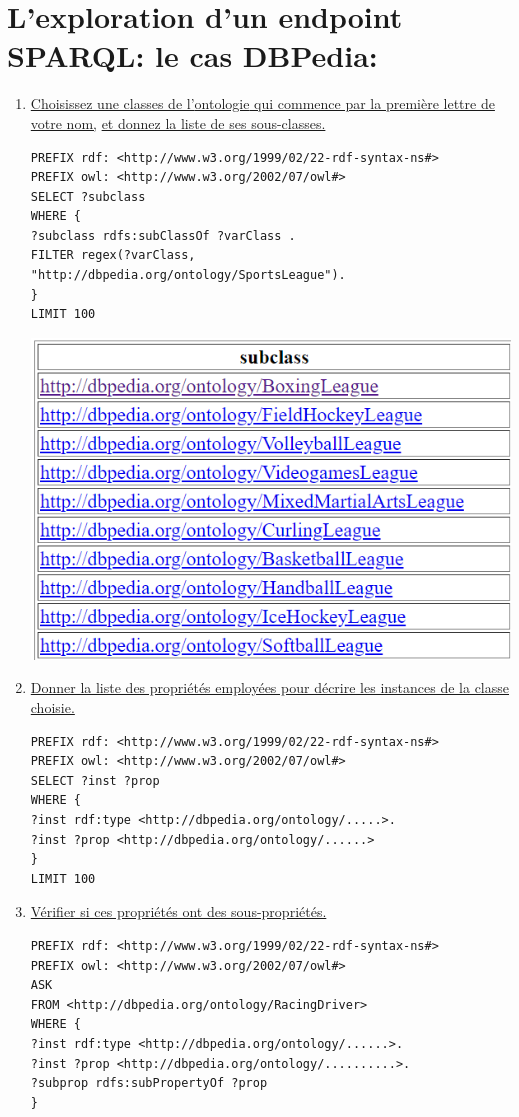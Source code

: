 \documentclass[12pt,a4paper]{article}
\begin{document}
    \section{L'exploration d'un endpoint SPARQL: le cas DBPedia: }
    \begin{justify}
        \begin{enumerate}
            \item \underline{Choisissez une classes de l\rq{ontologie} qui commence par la premi\`ere lettre de votre nom,} \underline{et donnez la liste de
            ses sous-classes.} \\
            \begin{verbatim}
PREFIX rdf: <http://www.w3.org/1999/02/22-rdf-syntax-ns#>
PREFIX owl: <http://www.w3.org/2002/07/owl#>
SELECT ?subclass
WHERE {
?subclass rdfs:subClassOf ?varClass .
FILTER regex(?varClass, "http://dbpedia.org/ontology/SportsLeague").
}
LIMIT 100
            \end{verbatim}
            \begin{center}
                \includegraphics{Quest31}
            \end{center}
            \item \underline{Donner la liste des propriétés employées pour décrire les instances de la classe choisie.}
            \begin{verbatim}
PREFIX rdf: <http://www.w3.org/1999/02/22-rdf-syntax-ns#>
PREFIX owl: <http://www.w3.org/2002/07/owl#>
SELECT ?inst ?prop
WHERE {
?inst rdf:type <http://dbpedia.org/ontology/.....>.
?inst ?prop <http://dbpedia.org/ontology/......>
}
LIMIT 100
            \end{verbatim}
            \item \underline{Vérifier si ces propriétés ont des sous-propriétés.}
            \begin{verbatim}
PREFIX rdf: <http://www.w3.org/1999/02/22-rdf-syntax-ns#>
PREFIX owl: <http://www.w3.org/2002/07/owl#>
ASK
FROM <http://dbpedia.org/ontology/RacingDriver>
WHERE {
?inst rdf:type <http://dbpedia.org/ontology/......>.
?inst ?prop <http://dbpedia.org/ontology/..........>.
?subprop rdfs:subPropertyOf ?prop
}
            \end{verbatim}
        \end{enumerate}
    \end{justify}
\end{document}
